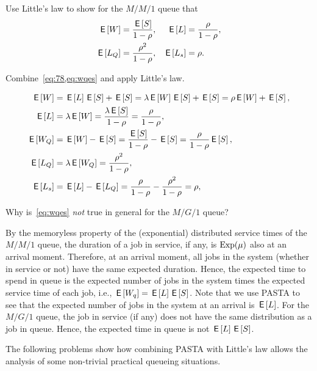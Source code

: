 \begin{exercise}
Use Little's law to show for the $M/M/1$ queue that 
 \begin{align*}
 \,\mathsf{E}\left[W\right] &= \frac{\,\mathsf{E}\left[S\right]}{1-\rho}, & \,\mathsf{E}\left[L\right] &= \frac\rho{1-\rho}, \\
 \,\mathsf{E}\left[L_Q\right] &= \frac{\rho^2}{1-\rho}, & \,\mathsf{E}\left[L_s\right] &= \rho.
 \end{align*}
\begin{hint}
 Combine~\cref{eq:78,eq:wqes} and apply Little's law. 
\end{hint}
\begin{solution}
\begin{align*}
 \,\mathsf{E}\left[W\right] &= \,\mathsf{E}\left[L\right] \,\mathsf{E}\left[S\right] + \,\mathsf{E}\left[S\right] = \lambda \,\mathsf{E}\left[W\right] \,\mathsf{E}\left[S\right] + \,\mathsf{E}\left[S\right]= \rho \,\mathsf{E}\left[W\right] + \,\mathsf{E}\left[S\right], \\
 \,\mathsf{E}\left[L\right] &= \lambda \,\mathsf{E}\left[W\right] = \frac{\lambda \,\mathsf{E}\left[S\right]}{1-\rho} = \frac\rho{1-\rho}, \\
 \,\mathsf{E}\left[W_Q\right] &= \,\mathsf{E}\left[W\right] - \,\mathsf{E}\left[S\right] = \frac{\,\mathsf{E}\left[S\right]}{1-\rho} - \,\mathsf{E}\left[S\right] = \frac{\rho}{1-\rho} \,\mathsf{E}\left[S\right],\\
 \,\mathsf{E}\left[L_Q\right] &= \lambda \,\mathsf{E}\left[W_Q\right] = \frac{\rho^2}{1-\rho}, \\
 \,\mathsf{E}\left[L_s\right] &= \,\mathsf{E}\left[L\right] - \,\mathsf{E}\left[L_Q\right] = \frac{\rho}{1-\rho} - \frac{\rho^2}{1-\rho} = \rho, 
\end{align*}
\end{solution}
\end{exercise}

\begin{exercise}
Why is~\cref{eq:wqes} \emph{not} true in general for the $M/G/1$ queue? 
\begin{solution}
 By the memoryless property of the (exponential) distributed service times of the $M/M/1$ queue, the duration of a job in service, if any, is $\operatorname{Exp}(\mu)$ also at an arrival moment.
 Therefore, at an arrival moment, all jobs in the system (whether in service or not) have the same expected duration.
 Hence, the expected time to spend in queue is the expected number of jobs in the system times the expected service time of each job, i.e., $\,\mathsf{E}\left[W_q\right] = \,\mathsf{E}\left[L\right] \,\mathsf{E}\left[S\right]$.
 Note that we use PASTA to see that the expected number of jobs in the system at an arrival is $\,\mathsf{E}\left[L\right]$.
 For the $M/G/1$ queue, the job in service (if any) does not have the same distribution as a job in queue.
 Hence, the expected time in queue is not $\,\mathsf{E}\left[L\right] \,\mathsf{E}\left[S\right]$.
\end{solution}
\end{exercise}


The following problems show how combining PASTA with Little's law allows the analysis of some non-trivial practical queueing situations.

